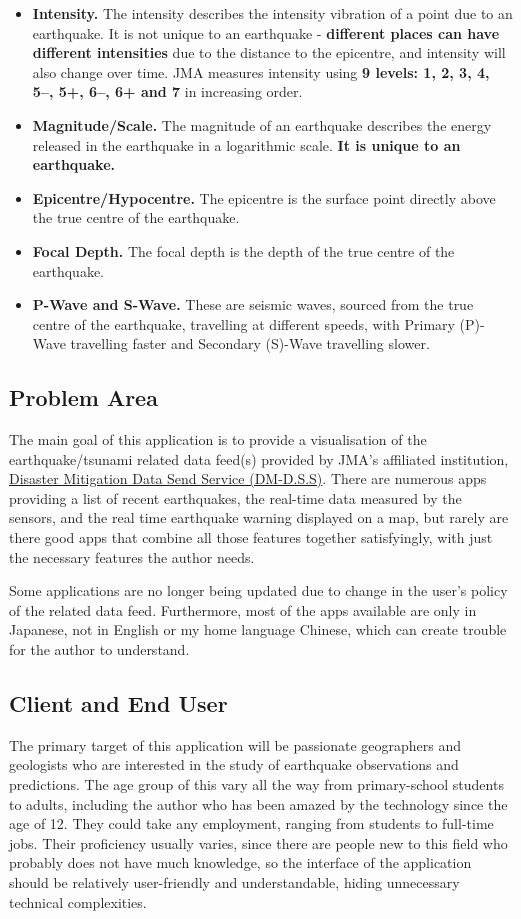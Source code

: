 \documentclass[10pt]{article}
\begin{document}
\begin{itemize}
    \item \textbf{Intensity.} The intensity describes the intensity vibration of a point due to an earthquake. It is not unique to an earthquake - \textbf{different places can have different intensities} due to the distance to the epicentre, and intensity will also change over time. JMA measures intensity using \textbf{9 levels: 1, 2, 3, 4, 5--, 5+, 6--, 6+ and 7} in increasing order.
    \item \textbf{Magnitude/Scale.} The magnitude of an earthquake describes the energy released in the earthquake in a logarithmic scale. \textbf{It is unique to an earthquake.}
    \item \textbf{Epicentre/Hypocentre.} The epicentre is the surface point directly above the true centre of the earthquake.
    \item \textbf{Focal Depth.} The focal depth is the depth of the true centre of the earthquake.
    \item \textbf{P-Wave and S-Wave.} These are seismic waves, sourced from the true centre of the earthquake, travelling at different speeds, with Primary (P)-Wave travelling faster and Secondary (S)-Wave travelling slower.
\end{itemize}

\subsection{Problem Area}
The main goal of this application is to provide a visualisation of the earthquake/tsunami related data feed(s) provided by JMA's affiliated institution, \href{https://dmdata.jp}{Disaster Mitigation Data Send Service (DM-D.S.S)}. There are numerous apps providing a list of recent earthquakes, the real-time data measured by the sensors, and the real time earthquake warning displayed on a map, but rarely are there good apps that combine all those features together satisfyingly, with just the necessary features the author needs.

Some applications are no longer being updated due to change in the user's policy of the related data feed. Furthermore, most of the apps available are only in Japanese, not in English or my home language Chinese, which can create trouble for the author to understand.

\subsection{Client and End User}
The primary target of this application will be passionate geographers and geologists who are interested in the study of earthquake observations and predictions. The age group of this vary all the way from primary-school students to adults, including the author who has been amazed by the technology since the age of 12. They could take any employment, ranging from students to full-time jobs. Their proficiency usually varies, since there are people new to this field who probably does not have much knowledge, so the interface of the application should be relatively user-friendly and understandable, hiding unnecessary technical complexities.
\end{document}
